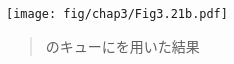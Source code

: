 \begin{figure}[tb]
\label{Figure 3.21}
\centering
\begin{comment}
\heading{Figure 3.21:} Result of using \code{(delete\-/queue!  q)} on the queue of \link{Figure 3.20}.

\begin{example}
       +---+---+
  q -->| * | *-+--------------------------------+
       +-|-+---+                                |
         +------------+                         |
            front-ptr |                         | rear-ptr
                      V                         V
     +---+---+    +---+---+    +---+---+    +---+---+
     | * | *-+--->| * | *-+--->| * | *-+--->| * | / |
     +-|-+---+    +-|-+---+    +-|-+---+    +-|-+---+
       V            V            V            V
     +---+        +---+        +---+        +---+
     | a |        | b |        | c |        | d |
     +---+        +---+        +---+        +---+
\end{example}
\end{comment}
\texttt{[image: fig/chap3/Fig3.21b.pdf]}
\begin{quote}
 のキューにを用いた結果
\end{quote}
\end{figure}



